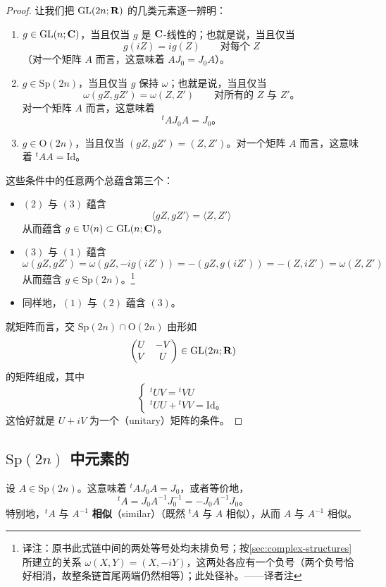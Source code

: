 \begin{proof}
让我们把 $\mathrm{GL}(2n;\mathbf{R})$ 的几类元素逐一辨明：
\begin{enumerate}[label=(\arabic*)]
\item $g\in\mathrm{GL}(n;\mathbf{C})$，当且仅当 $g$ 是 $\mathbf{C}$-线性的；也就是说，当且仅当
\[
g(iZ)=ig(Z)\qquad\text{对每个 }Z
\]
（对一个矩阵 $A$ 而言，这意味着 $AJ_0=J_0A$）。
\item $g\in\mathrm{Sp}(2n)$，当且仅当 $g$ 保持 $\omega$；也就是说，当且仅当
\[
\omega(gZ,gZ')=\omega(Z,Z')\qquad\text{对所有的 }Z\text{ 与 }Z'\text{。}
\]
对一个矩阵 $A$ 而言，这意味着
\[
{}^tAJ_0A=J_0\text{。}
\]
\item $g\in\mathrm{O}(2n)$，当且仅当 $(gZ,gZ')=(Z,Z')$。对一个矩阵 $A$ 而言，这意味着 ${}^tAA=\mathrm{Id}$。
\end{enumerate}
这些条件中的任意两个总蕴含第三个：
\begin{itemize}
\item $(2)$ 与 $(3)$ 蕴含
\[
\langle gZ,gZ'\rangle=\langle Z,Z'\rangle
\]
从而蕴含 $g\in\mathrm{U}(n)\subset\mathrm{GL}(n;\mathbf{C})$。
\item $(3)$ 与 $(1)$ 蕴含
\[
\omega(gZ,gZ')=\omega(gZ,-ig(iZ'))=-(gZ,g(iZ'))=-(Z,iZ')=\omega(Z,Z')
\]
从而蕴含 $g\in\mathrm{Sp}(2n)$。\footnote{译注：原书此式链中间的两处等号处均未排负号；按\cref{sec:complex-structures}所建立的关系 $\omega(X,Y)=(X,-iY)$，这两处各应有一个负号（两个负号恰好相消，故整条链首尾两端仍然相等）；此处径补。——译者注}
\item 同样地，$(1)$ 与 $(2)$ 蕴含 $(3)$。
\end{itemize}
就矩阵而言，交 $\mathrm{Sp}(2n)\cap\mathrm{O}(2n)$ 由形如
\[
\begin{pmatrix}
U & -V\\
V & U
\end{pmatrix}\in\mathrm{GL}(2n;\mathbf{R})
\]
的矩阵组成，其中
\[
\begin{cases}
{}^tUV={}^tVU\\
{}^tUU+{}^tVV=\mathrm{Id}\text{。}
\end{cases}
\]
这恰好就是 $U+iV$ 为一个\textbf{\trUnitary}（unitary）矩阵的条件。
\end{proof}

\subsection{$\mathrm{Sp}(2n)$ 中元素的\trEigenvalue}

设 $A\in\mathrm{Sp}(2n)$。这意味着 ${}^tAJ_0A=J_0$，或者等价地，
\[
{}^tA=J_0A^{-1}J_0^{-1}=-J_0A^{-1}J_0\text{。}
\]
特别地，${}^tA$ 与 $A^{-1}$ \textbf{相似}（similar）（既然 ${}^tA$ 与 $A$ 相似），从而 $A$ 与 $A^{-1}$ 相似。

